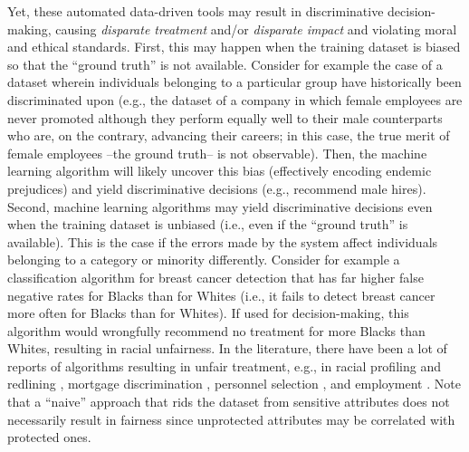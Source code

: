 \documentclass[letterpaper]{article} %
\theoremstyle{definition}
\newcommand{\1}{\ensuremath{{\rm e}}} %
\begin{document}
Yet, these automated data-driven tools may result in discriminative decision-making, causing \emph{disparate treatment} and/or \emph{disparate impact} and violating moral and ethical standards. First, this may happen when the training dataset is biased so that the ``ground truth'' is not available. Consider for example the case of a dataset wherein individuals belonging to a particular group have historically been discriminated upon (e.g., the dataset of a company in which female employees are never promoted although they perform equally well to their male counterparts who are, on the contrary, advancing their careers; in this case, the true merit of female employees --the ground truth-- is not observable). Then, the machine learning algorithm will likely uncover this bias (effectively encoding endemic prejudices) and yield discriminative decisions (e.g., recommend male hires). Second, machine learning algorithms may yield discriminative decisions even when the training dataset is unbiased (i.e., even if the ``ground truth'' is available). This is the case if the errors made by the system affect individuals belonging to a category or minority differently. Consider for example a classification algorithm for breast cancer detection that has far higher false negative rates for Blacks than for Whites (i.e., it fails to detect breast cancer more often for Blacks than for Whites). If used for decision-making, this algorithm would wrongfully recommend no treatment for more Blacks than Whites, resulting in racial unfairness. In the literature, there have been a lot of reports of algorithms resulting in unfair treatment, e.g., in racial profiling and redlining \cite{squires2003insuranceprofiling}, mortgage discrimination \cite{LaCOUR-LITTLE1999}, personnel selection \cite{Stoll2004blackjobapplicants}, and employment \cite{Kuhn1990sexdiscriminationlabor}. Note that a ``naive'' approach that rids the dataset from sensitive attributes does not necessarily result in fairness since unprotected attributes may be correlated with protected ones.
\end{document}

